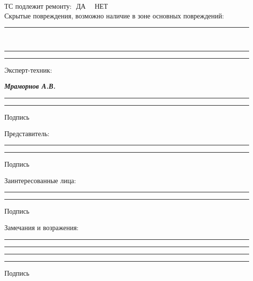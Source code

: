 \documentclass[a4paper,10pt]{report}
\begin{document}
\vspace{2mm}

\noindent ТС подлежит ремонту:\,\, ДА\, \,\,\, НЕТ \\
\noindent Скрытые повреждения, возможно наличие в зоне основных повреждений: \rule{50mm}{0.1mm}\\
\rule{170mm}{0.1mm}
\rule{170mm}{0.1mm}

\vspace{3mm}
\begin{tcolorbox}[title=\textsl{Подписи и замечания сторон},leftrule=0pt,rightrule=0pt,toprule=0pt,titlerule=0pt,sharp corners,
	colback=white,colframe=white,coltitle=black,colbacktitle=YellowOrange]
\end{tcolorbox}
\vspace{-5mm}
\centering
\raggedright Эксперт-техник: \\ \hspace{1.7cm}
\raggedright\textbf{\textsl{ Мраморнов А.В. }}
\vspace{-3mm}

\centering 
\rule{50mm}{0.1mm} \hspace{5cm} \rule{50mm}{0.1mm}

\hspace{10.5cm} {\footnotesize Подпись}

\vspace{0mm}
\centering
\raggedright Представитель: \\ \hspace{1.7cm}
\raggedright\textbf{  }
\vspace{-3mm}

\centering 
\rule{50mm}{0.1mm} \hspace{5cm} \rule{50mm}{0.1mm}

\hspace{10.5cm} {\footnotesize Подпись}

\vspace{0mm}
\centering
\raggedright Заинтересованные лица: \\ \hspace{1.7cm}
\raggedright\textbf{  }
\vspace{-3mm}

\centering 
\rule{50mm}{0.1mm} \hspace{5cm} \rule{50mm}{0.1mm}

\hspace{10.5cm} {\footnotesize Подпись}

\vspace{5mm}

\raggedright
Замечания и возражения: 

\rule{175mm}{0.1mm}
\rule{175mm}{0.1mm}
\rule{175mm}{0.1mm}

\vspace{5mm}
\hspace{11cm} \rule{50mm}{0.1mm}

\hspace{13cm} {\footnotesize Подпись}
\end{document}
